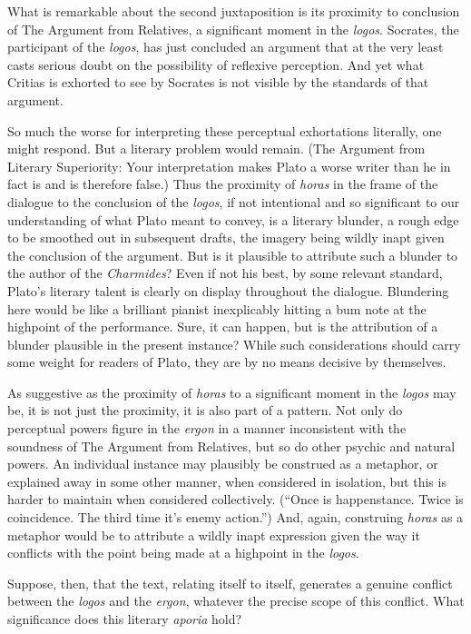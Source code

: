 What is remarkable about the second juxtaposition is its proximity to conclusion of The Argument from Relatives, a significant moment in the \emph{logos}. Socrates, the participant of the \emph{logos}, has just concluded an argument that at the very least casts serious doubt on the possibility of reflexive perception. And yet what Critias is exhorted to see by Socrates is not visible by the standards of that argument. 

So much the worse for interpreting these perceptual exhortations literally, one might respond. But a literary problem would remain. (The Argument from Literary Superiority: Your interpretation makes Plato a worse writer than he in fact is and is therefore false.) Thus the proximity of \emph{horas} in the frame of the dialogue to the conclusion of the \emph{logos}, if not intentional and so significant to our understanding of what Plato meant to convey, is a literary blunder, a rough edge to be smoothed out in subsequent drafts, the imagery being wildly inapt given the conclusion of the argument. But is it plausible to attribute such a blunder to the author of the \emph{Charmides}? Even if not his best, by some relevant standard, Plato's literary talent is clearly on display throughout the dialogue. Blundering here would be like a brilliant pianist inexplicably hitting a bum note at the highpoint of the performance. Sure, it can happen, but is the attribution of a blunder plausible in the present instance? While such considerations should carry some weight for readers of Plato, they are by no means decisive by themselves.

As suggestive as the proximity of \emph{horas} to a significant moment in the \emph{logos} may be, it is not just the proximity, it is also part of a pattern. Not only do perceptual powers figure in the \emph{ergon} in a manner inconsistent with the soundness of The Argument from Relatives, but so do other psychic and natural powers. An individual instance may plausibly be construed as a metaphor, or explained away in some other manner, when considered in isolation, but this is harder to maintain when considered collectively. (``Once is happenstance. Twice is coincidence. The third time it's enemy action.'') And, again, construing \emph{horas} as a metaphor would be to attribute a wildly inapt expression given the way it conflicts with the point being made at a highpoint in the \emph{logos}.

Suppose, then, that the text, relating itself to itself, generates a genuine conflict between the \emph{logos} and the \emph{ergon}, whatever the precise scope of this conflict. What significance does this literary \emph{aporia} hold?

